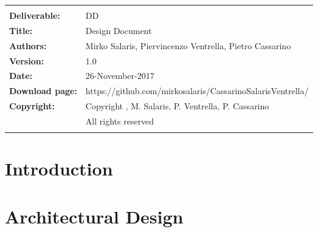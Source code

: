 


	
	
	
	\begin{table}[h!]
		\begin{tabu} to \textwidth { X[0.3,r,p] X[0.7,l,p] }
			\hline
			\smallskip & \smallskip\\
			\textbf{Deliverable:} & DD\\
			\textbf{Title:} & Design Document \\
			\textbf{Authors:} & Mirko Salaris, Piervincenzo Ventrella, Pietro Cassarino \\
			\textbf{Version:} & 1.0 \\ 
			\textbf{Date:} & 26-November-2017 \\
			\textbf{Download page:} & https://github.com/mirkosalaris/CassarinoSalarisVentrella/\\
			\textbf{Copyright:} & Copyright , M. Salaris, P. Ventrella, P. Cassarino\\
			\hfill & All rights reserved \\
			\smallskip & \smallskip\\
			\hline
		\end{tabu}
	\end{table}
	
	\newpage
	\renewcommand{\contentsname}{Table of Contents} %
	{\hypersetup{hidelinks}
		\tableofcontents
		\listoffigures
	}
	
	\clearpage
	\section{Introduction}
	\label{sect:introduction}
	
	
	\clearpage
	\section{Architectural Design}
	\label{sect:architecturalDesign}
	
	
